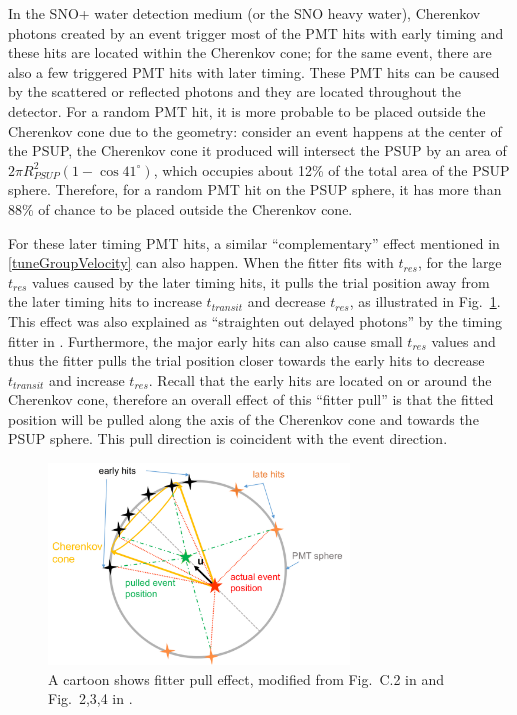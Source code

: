 In the SNO+ water detection medium (or the SNO heavy water), Cherenkov photons created by an event trigger most of the PMT hits with early timing and these hits are located within the Cherenkov cone; for the same event, there are also a few triggered PMT hits with later timing. These PMT hits can be caused by the scattered or reflected photons and they are located throughout the detector. For a random PMT hit, it is more probable to be placed outside the Cherenkov cone due to the geometry: consider an event happens at the center of the PSUP, the Cherenkov cone it produced will intersect the PSUP by an area of $2\pi R^2_{PSUP}(1-\cos41^\circ)$, which occupies about 12\% of the total area of the PSUP sphere. Therefore, for a random PMT hit on the PSUP sphere, it has more than 88\% of chance to be placed outside the Cherenkov cone. 

For these later timing PMT hits, a similar ``complementary'' effect mentioned in \ref{tuneGroupVelocity} can also happen. When the fitter fits with $t_{res}$, for the large $t_{res}$ values caused by the later timing hits, it pulls the trial position away from the later timing hits to increase $t_{transit}$ and decrease $t_{res}$, as illustrated in Fig.~\ref{fitterPull}. This effect was also explained as ``straighten out delayed photons'' by the timing fitter in \cite{driveCorPeter}. Furthermore, the major early hits can also cause small $t_{res}$ values and thus the fitter pulls the trial position closer towards the early hits to decrease $t_{transit}$ and increase $t_{res}$. Recall that the early hits are located on or around the Cherenkov cone, therefore an overall effect of this ``fitter pull'' is that the fitted position will be pulled along the axis of the Cherenkov cone and towards the PSUP sphere. This pull direction is coincident with the event direction.

\begin{figure}[!htb]
	\centering
	\includegraphics[width=8cm]{fitterPull.png}
\caption{ A cartoon shows fitter pull effect, modified from Fig.~C.2 in \cite{brice1996monte} and Fig.~2,3,4 in \cite{driveCorPeter}.}
	\label{fitterPull}
\end{figure}


